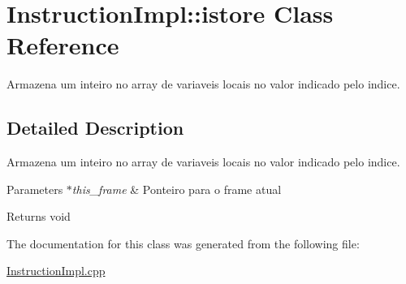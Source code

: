 \hypertarget{class_instruction_impl_1_1istore}{}\section{Instruction\+Impl\+:\+:istore Class Reference}
\label{class_instruction_impl_1_1istore}


Armazena um inteiro no array de variaveis locais no valor indicado pelo indice.  




\subsection{Detailed Description}
Armazena um inteiro no array de variaveis locais no valor indicado pelo indice. 


\begin{DoxyParams}{Parameters}
{\em $\ast$this\+\_\+frame} & Ponteiro para o frame atual \\
\hline
\end{DoxyParams}
\begin{DoxyReturn}{Returns}
void 
\end{DoxyReturn}


The documentation for this class was generated from the following file\+:\begin{DoxyCompactItemize}
\item 
\hyperlink{_instruction_impl_8cpp}{Instruction\+Impl.\+cpp}\end{DoxyCompactItemize}

